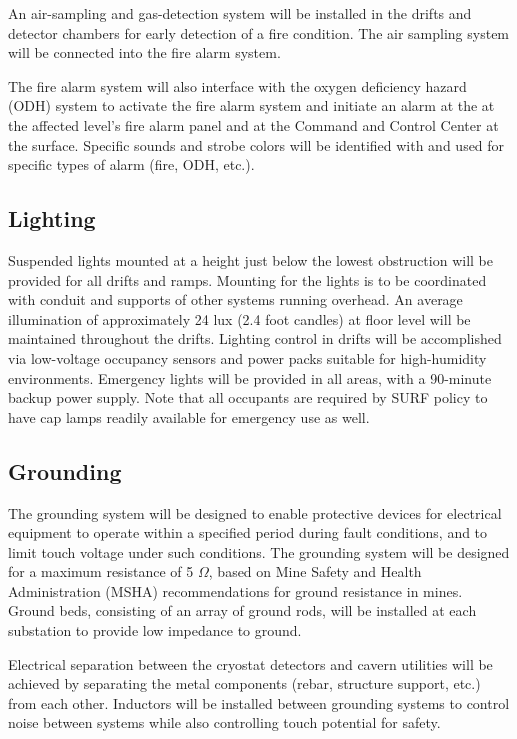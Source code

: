 An air-sampling and gas-detection system will be installed in the drifts and detector chambers for early detection of a fire condition. The air sampling system will be connected into the fire alarm system.

The fire alarm system will also interface with the oxygen deficiency hazard (ODH) system to activate the fire alarm system and initiate an alarm at the at the affected level’s fire alarm panel and at the Command and Control Center at the surface. Specific sounds and strobe colors will be identified with and
used for specific types of alarm (fire, ODH, etc.).

\subsection{Lighting}
\label{sec:fscf-und-light}

Suspended lights mounted at a height just below the lowest obstruction will be provided for all drifts and ramps. Mounting for the lights is to be coordinated with conduit and supports of other systems running overhead. An average illumination of approximately 24 lux (2.4 foot candles) at floor level will be maintained throughout the drifts. Lighting control in drifts will be accomplished via low-voltage occupancy sensors and power packs suitable for high-humidity environments.  Emergency lights will be provided in all areas, with a 90-minute backup power supply.  Note that all occupants are required by SURF policy to have cap lamps readily available for emergency use as well.


\subsection{Grounding}
\label{sec:fscf-und-grounding}

The grounding system will be designed to 
enable protective devices for electrical equipment to operate within a specified period during fault conditions, and to limit touch voltage under such conditions.  The grounding system will be designed for a maximum resistance of 5 $\Omega$, based on Mine Safety and Health Administration (MSHA) recommendations for ground resistance in mines.  Ground beds, consisting of an array of ground rods, will be installed at each substation to provide low impedance to ground.

Electrical separation between the cryostat detectors and cavern utilities will be achieved by separating the metal components (rebar, structure support, etc.) from each other. Inductors will be installed between grounding systems to control noise between systems while also controlling touch potential for safety.

